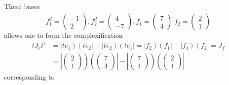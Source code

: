 \documentclass[aps,preprint]{revtex4}
\begin{document}
These bases 
\begin{equation}
f_{1}^{d}=\left( 
\begin{array}{c}
-1 \\ 
2%
\end{array}%
\right) ,f_{2}^{d}=\left( 
\begin{array}{c}
4 \\ 
-7%
\end{array}%
\right) ;f_{1}=\left( 
\begin{array}{c}
7 \\ 
4%
\end{array}%
\right) ^{\prime }f_{2}=\left( 
\begin{array}{c}
2 \\ 
1%
\end{array}%
\right)
\end{equation}%
allows one to form the complexification 
\begin{align}
tJ_{e}t^{t}& =\left\vert te_{1}\right) \left( te_{2}\right\vert -\left\vert
te_{2}\right) \left( te_{1}\right\vert =\left\vert f_{2}\right) \left(
f_{1}\right\vert -\left\vert f_{1}\right) \left( f_{2}\right\vert =J_{f} \\
& =\left\vert \left( 
\begin{array}{c}
2 \\ 
1%
\end{array}%
\right) \right) \left( \left( 
\begin{array}{c}
7 \\ 
4%
\end{array}%
\right) \right\vert -\left\vert \left( 
\begin{array}{c}
7 \\ 
4%
\end{array}%
\right) \right) \left( \left( 
\begin{array}{c}
2 \\ 
1%
\end{array}%
\right) \right\vert
\end{align}%
corresponding to
\end{document}
